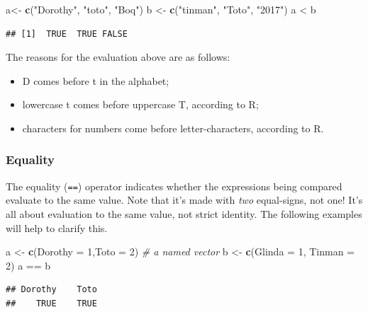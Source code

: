 \documentclass[]{book}
\makeatletter
\newenvironment{Shaded}{\begin{snugshade}}{\end{snugshade}}
\newcommand{\KeywordTok}[1]{\textcolor[rgb]{0.13,0.29,0.53}{\textbf{{#1}}}}
\newcommand{\DataTypeTok}[1]{\textcolor[rgb]{0.13,0.29,0.53}{{#1}}}
\newcommand{\DecValTok}[1]{\textcolor[rgb]{0.00,0.00,0.81}{{#1}}}
\newcommand{\StringTok}[1]{\textcolor[rgb]{0.31,0.60,0.02}{{#1}}}
\newcommand{\CommentTok}[1]{\textcolor[rgb]{0.56,0.35,0.01}{\textit{{#1}}}}
\newcommand{\NormalTok}[1]{{#1}}
\providecommand{\tightlist}{%
  \setlength{\itemsep}{0pt}\setlength{\parskip}{0pt}}
\newenvironment{kframe}{%
\medskip{}
\setlength{\fboxsep}{.8em}
 \def\at@end@of@kframe{}%
 \ifinner\ifhmode%
  \def\at@end@of@kframe{\end{minipage}}%
  \begin{minipage}{\columnwidth}%
 \fi\fi%
 \def\FrameCommand##1{\hskip\@totalleftmargin \hskip-\fboxsep
 \colorbox{shadecolor}{##1}\hskip-\fboxsep
     \hskip-\linewidth \hskip-\@totalleftmargin \hskip\columnwidth}%
 \MakeFramed {\advance\hsize-\width
   \@totalleftmargin\z@ \linewidth\hsize
   \@setminipage}}%
 {\par\unskip\endMakeFramed%
 \at@end@of@kframe}
\renewenvironment{Shaded}{\begin{kframe}}{\end{kframe}}
\theoremstyle{definition}
\theoremstyle{definition}
\theoremstyle{remark}
\makeatother
\begin{document}
\begin{Shaded}
\begin{Highlighting}[]
\NormalTok{a<-}\StringTok{ }\KeywordTok{c}\NormalTok{(}\StringTok{"Dorothy"}\NormalTok{, }\StringTok{"toto"}\NormalTok{, }\StringTok{"Boq"}\NormalTok{)}
\NormalTok{b <-}\StringTok{ }\KeywordTok{c}\NormalTok{(}\StringTok{"tinman"}\NormalTok{, }\StringTok{"Toto"}\NormalTok{, }\StringTok{"2017"}\NormalTok{)}
\NormalTok{a <}\StringTok{ }\NormalTok{b}
\end{Highlighting}
\end{Shaded}

\begin{verbatim}
## [1]  TRUE  TRUE FALSE
\end{verbatim}

The reasons for the evaluation above are as follows:

\begin{itemize}
\tightlist
\item
  D comes before t in the alphabet;
\item
  lowercase t comes before uppercase T, according to R;
\item
  characters for numbers come before letter-characters, according to R.
\end{itemize}

\subsubsection{Equality}\label{equality}

The equality (\texttt{==}) operator indicates whether the expressions
being compared evaluate to the same value. Note that it's made with
\emph{two} equal-signs, not one! It's all about evaluation to the same
value, not strict identity. The following examples will help to clarify
this.

\begin{Shaded}
\begin{Highlighting}[]
\NormalTok{a <-}\StringTok{ }\KeywordTok{c}\NormalTok{(}\DataTypeTok{Dorothy =} \DecValTok{1}\NormalTok{,}\DataTypeTok{Toto =} \DecValTok{2}\NormalTok{) }\CommentTok{# a named vector}
\NormalTok{b <-}\StringTok{ }\KeywordTok{c}\NormalTok{(}\DataTypeTok{Glinda =} \DecValTok{1}\NormalTok{, }\DataTypeTok{Tinman =} \DecValTok{2}\NormalTok{)}
\NormalTok{a ==}\StringTok{ }\NormalTok{b}
\end{Highlighting}
\end{Shaded}

\begin{verbatim}
## Dorothy    Toto 
##    TRUE    TRUE
\end{verbatim}
\end{document}
